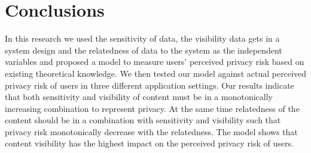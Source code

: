 \documentclass[10pt]{article}
\newcommand{\sansserifformat}[1]{\fontfamily{cmss}{ #1}}%
\begin{document}
\section{Conclusions}
In this research we used the sensitivity of data, the visibility data gets in a system design and the relatedness of data to the system as the independent variables and proposed a model to measure users' perceived privacy risk based on existing theoretical knowledge. We then tested our model against actual perceived privacy risk of users in three different application settings. Our results indicate that both sensitivity and visibility of content must be in a monotonically increasing combination to represent privacy. At the same time relatedness of the content should be in a combination with sensitivity and visibility such that privacy risk monotonically decrease with the relatedness. The model shows that content visibility has the highest impact on the perceived privacy risk of users.






\footnotesize


\end{document}
